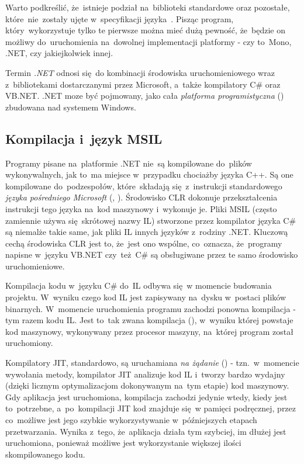 Warto podkreślić, że~istnieje podział na~biblioteki standardowe oraz pozostałe, które~nie~zostały ujęte w~specyfikacji języka~\cite{cSharp:spec}. Pisząc program, który~wykorzystuje tylko te pierwsze można mieć dużą pewność, że~będzie on możliwy do~uruchomienia na~dowolnej implementacji platformy - czy to~Mono, .NET, czy jakiejkolwiek innej.

Termin \emph{.NET} odnosi się~do kombinacji środowiska uruchomieniowego wraz z~bibliotekami dostarczanymi przez Microsoft, a~także kompilatory C\# oraz VB.NET. .NET moze być pojmowany, jako cała \emph{platforma programistyczna} () zbudowana nad systemem Windows.


\subsection{Kompilacja i~język MSIL}\label{sec:msil}
Programy pisane na~platformie .NET nie~są kompilowane do~plików wykonywalnych, jak to~ma miejsce w~przypadku chociażby języka C++. Są one kompilowane do~podzespołów, które~składają się~z~instrukcji standardowego \emph{języka pośredniego Microsoft} (, ). Środowisko CLR dokonuje przekształcenia instrukcji tego języka na~kod maszynowy i~wykonuje je. Pliki MSIL (często zamiennie używa się~skrótowej nazwy IL) stworzone przez kompilator języka C\# są niemalże takie same, jak pliki IL innych języków z~rodziny .NET. Kluczową cechą środowiska CLR jest to, że~jest ono wspólne, co~oznacza, że~programy napisne w~języku VB.NET czy~też~C\# są obsługiwane przez te samo środowisko uruchomieniowe.

Kompilacja kodu w~języku C\# do~IL odbywa się~w momencie budowania projektu. W~wyniku czego kod IL jest zapisywany na~dysku w~postaci plików binarnych. W~momencie uruchomienia programu zachodzi ponowna kompilacja - tym razem kodu IL. Jest to~tak zwana kompilacja  (), w~wyniku której powstaje kod maszynowy, wykonywany przez procesor maszyny, na~której program został uruchomiony.

Kompilatory JIT, standardowo, są uruchamiana \emph{na żądanie} () - tzn.~w~momencie wywołania metody, kompilator JIT analizuje kod IL i~tworzy bardzo wydajny (dzięki licznym optymalizacjom dokonywanym na~tym etapie) kod maszynowy. Gdy aplikacja jest uruchomiona, kompilacja zachodzi jedynie wtedy, kiedy jest to~potrzebne, a~po~kompilacji JIT kod znajduje się~w pamięci podręcznej, przez co~możliwe jest jego szybkie wykorzystywanie w~późniejszych etapach przetwarzania. Wynika z~tego, że~aplikacja działa tym szybciej, im dłużej jest uruchomiona, ponieważ możliwe jest wykorzystanie większej ilości skompilowanego kodu.

